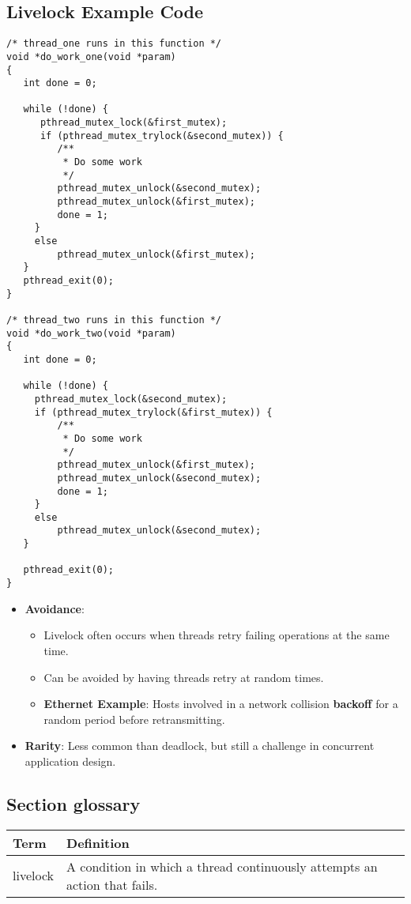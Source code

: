 \subsection{Livelock Example Code}
\begin{verbatim}
/* thread_one runs in this function */
void *do_work_one(void *param)
{
   int done = 0;
 
   while (!done) {
      pthread_mutex_lock(&first_mutex);
      if (pthread_mutex_trylock(&second_mutex)) {
         /**
          * Do some work
          */
         pthread_mutex_unlock(&second_mutex);
         pthread_mutex_unlock(&first_mutex);
         done = 1;
     }
     else
         pthread_mutex_unlock(&first_mutex);
   }
   pthread_exit(0);
}
 
/* thread_two runs in this function */
void *do_work_two(void *param)
{
   int done = 0;
 
   while (!done) {
     pthread_mutex_lock(&second_mutex);
     if (pthread_mutex_trylock(&first_mutex)) {
         /**
          * Do some work
          */
         pthread_mutex_unlock(&first_mutex);
         pthread_mutex_unlock(&second_mutex);
         done = 1;
     }
     else
         pthread_mutex_unlock(&second_mutex);
   }
 
   pthread_exit(0);
}
\end{verbatim}

\begin{itemize}
    \item \textbf{Avoidance}:
    \begin{itemize}
        \item Livelock often occurs when threads retry failing operations at the same time.
        \item Can be avoided by having threads retry at random times.
        \item \textbf{Ethernet Example}: Hosts involved in a network collision \textbf{backoff} for a random period before retransmitting.
    \end{itemize}
    \item \textbf{Rarity}: Less common than deadlock, but still a challenge in concurrent application design.
\end{itemize}

\subsection{Section glossary}
\begin{tabular}{p{}p{}}
    \toprule
    \textbf{Term} & \textbf{Definition} \\
    \midrule
    livelock & A condition in which a thread continuously attempts an action that fails. \\
    \bottomrule
\end{tabular}

